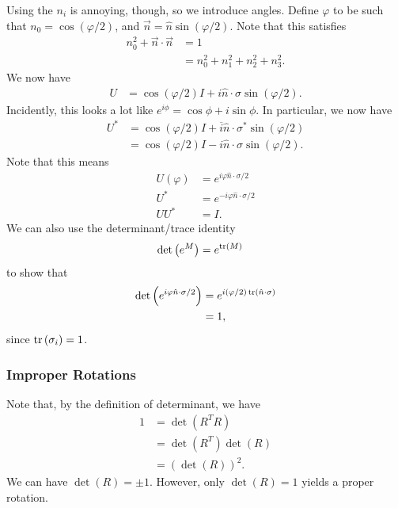 \documentclass[10pt]{mypackage}
\begin{document}
\begin{example}
  Using the $n_i$ is annoying, though, so we introduce angles. Define $\varphi$ to be such that $n_0 = \cos\left(\varphi/2\right)$, and $\vec{n} = \hat{n}\sin\left(\varphi/2\right)$. Note that this satisfies
  \begin{align*}
    n_0^2 + \vec{n}\cdot \vec{n} &= 1\\
                                 &= n_0^2 + n_1^2 + n_2^2 + n_3^2.
  \end{align*}
  We now have
  \begin{align*}
    U &= \cos\left(\varphi/2\right)I + i\hat{n}\cdot \sigma \sin\left(\varphi/2\right).
  \end{align*}
  Incidently, this looks a lot like $e^{i\phi} = \cos \phi + i\sin\phi$. In particular, we now have
  \begin{align*}
    U^{\ast} &= \cos\left(\varphi/2\right)I + \overline{i}\hat{n}\cdot\sigma^{\ast}\sin\left(\varphi/2\right)\\
             &= \cos\left(\varphi/2\right) I - i\hat{n}\cdot\sigma\sin\left(\varphi/2\right).
  \end{align*}
  Note that this means
  \begin{align*}
    U\left(\varphi\right) &= e^{i\varphi \hat{n}\cdot \sigma/2}\\
    U^{\ast} &= e^{-i\varphi\hat{n}\cdot\sigma/2}\\
    UU^{\ast} &= I.
  \end{align*}
  We can also use the determinant/trace identity
  \begin{align*}
    \det\left(e^{M}\right) &= e^{\tr(M)}
  \end{align*}
  to show that
  \begin{align*}
    \det\left(e^{i\varphi \hat{n}\cdot \sigma/2}\right) &= e^{i\left(\varphi/2\right)\tr\left(\hat{n}\cdot \sigma\right)}\\
                                                        &= 1,
  \end{align*}
  since $\tr\left(\sigma_i\right) = 1$.
\end{example}
\subsubsection{Improper Rotations}%
Note that, by the definition of determinant, we have
\begin{align*}
  1 &= \det\left(R^{T}R\right)\\
    &= \det\left(R^{T}\right)\det\left(R\right)\\
    &= \left(\det\left(R\right)\right)^2.
\end{align*}
We can have $\det(R) = \pm 1$. However, only $\det(R) = 1$ yields a proper rotation.\newline
\end{document}
